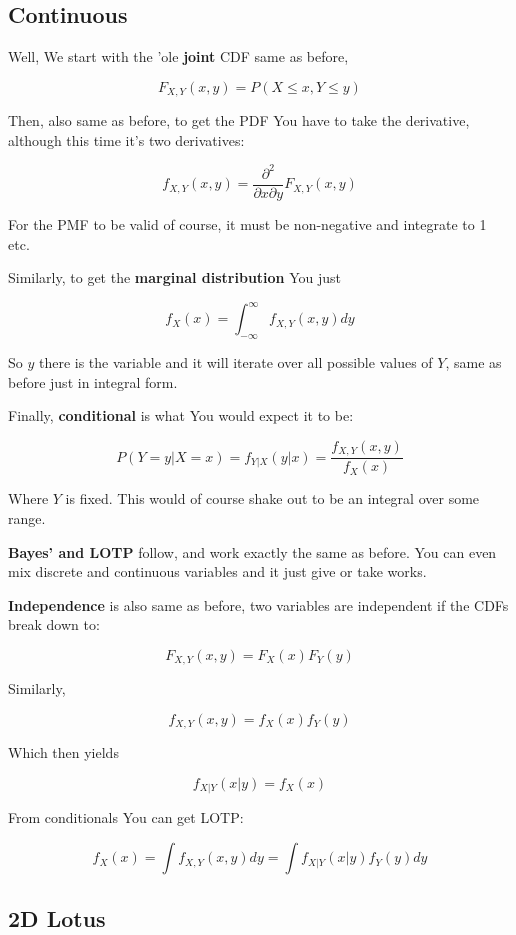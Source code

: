 \documentclass{article}
\begin{document}
		\subsection{Continuous}
			
			Well, We start with the 'ole \textbf{joint} CDF same as before,
			
			\[ F_{X, Y}(x, y) = P(X\le x, Y\le y) \]
			
			Then, also same as before, to get the PDF You have to take the derivative, although this time it's two derivatives:
			
			\[ f_{X, Y}(x, y) = \frac{\partial^2}{\partial x\partial y} F_{X, Y}(x, y) \]
		
			For the PMF to be valid of course, it must be non-negative and integrate to 1 etc.
			
			Similarly, to get the \textbf{marginal distribution} You just
			
			\[ f_X(x) = \int_{-\infty}^\infty f_{X, Y}(x, y) dy \]
		
			So $y$ there is the variable and it will iterate over all possible values of $Y$, same as before just in integral form. 
			
			Finally, \textbf{conditional} is what You would expect it to be:
			
			\[ P(Y = y|X = x) = f_{Y|X}(y|x) = \frac{f_{X, Y}(x, y)}{f_X(x)} \]
		
			Where $Y$ is fixed. This would of course shake out to be an integral over some range.
			
			\textbf{Bayes' and LOTP} follow, and work exactly the same as before. You can even mix discrete and continuous variables and it just give or take works.
			
			\textbf{Independence} is also same as before, two variables are independent if the CDFs break down to:
			
			\[ F_{X, Y}(x, y) = F_X(x)F_Y(y) \]
		
			Similarly, 
			
			\[ f_{X, Y}(x, y) = f_X(x)f_Y(y) \]
		
			Which then yields 
			
			\[ f_{X|Y}(x|y) = f_X(x)  \]
		
			From conditionals You can get LOTP:
			
			\[ f_X(x) = \int f_{X, Y}(x, y)dy = \int f_{X|Y}(x|y)f_Y(y)dy \]
			
	\subsection{2D Lotus}
	
\end{document}
